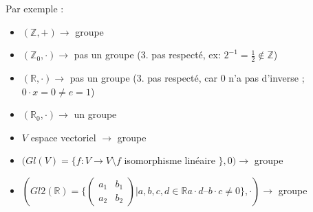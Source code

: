 \documentclass[11pt]{article}
\begin{document}
			Par exemple :
			\begin{itemize}
				\item $(\mathbb Z, +) \rightarrow$ groupe
				\item $(\mathbb Z_0, \cdot) \rightarrow$ pas un groupe (3. pas respecté, ex: $2^{-1} = \frac{1}{2} \not\in \mathbb Z$)
				\item $(\mathbb R, \cdot) \rightarrow$ pas un groupe (3.  pas respecté, car 0 n'a pas d'inverse ; $0 \cdot x = 0 \neq e = 1$)
				\item $(\mathbb R_0, \cdot) \rightarrow$ un groupe
				\item $V$ espace vectoriel $\rightarrow$ groupe
				\item $(Gl(V) = \{f : V \rightarrow V \setminus f$ isomorphisme linéaire $\}, 0) \rightarrow$ groupe
				\item $(Gl2(\mathbb R) = \{
					\begin{pmatrix}
  						a_1 & b_1 \\
						a_2 & b_2 
					\end{pmatrix} 
					| a, b, c, d \in \mathbb R  a \cdot d – b \cdot c \neq 0\}, \cdot) \rightarrow$ groupe
			\end{itemize}

		
\end{document}

